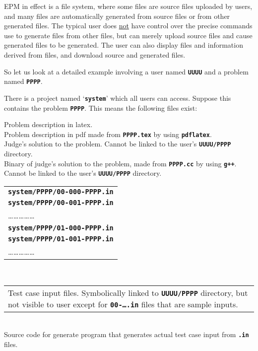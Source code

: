 \documentclass[12pt]{article}
\newcommand{\TT}[1]{{\tt \bfseries #1}}
\newenvironment{indpar}[1][0.4in]%
	{\begin{list}{}%
		     {\setlength{\itemsep}{0in}%
		      \setlength{\topsep}{0in}%
		      \setlength{\parsep}{1ex}%
		      \setlength{\labelwidth}{#1}%
		      \setlength{\leftmargin}{#1}%
		      \addtolength{\leftmargin}{\labelsep}}%
	 \item}%
	{\end{list}}
\newcommand{\ITEM}{\hspace*{-0.2in}}
\begin{document}
EPM in effect is a file system, where some files are source
files uploaded by users, and many files are automatically
generated from source files or from other generated files.
The typical user does \underline{not} have control over
the precise commands use to generate files from other
files, but can merely upload source files and cause generated
files to be generated.  The user can also display files
and information derived from files, and download source
and generated files.

So let us look at a detailed example involving a user named
\TT{UUUU} and a problem named \TT{PPPP}.

There is a project named `\TT{system}' which all users can access.
Suppose this contains the problem \TT{PPPP}.  This means the
following files exist:

\begin{indpar}
\ITEM\TT{system/PPPP/PPPP.tex}  Problem description in latex.
\\
\ITEM\TT{system/PPPP/PPPP.pdf}  Problem description in pdf made from
    \TT{PPPP.tex} by using \TT{pdflatex}.
\\
\ITEM\TT{system/PPPP/PPPP.cc}  Judge's solution to the problem.
    Cannot be linked to the user's \TT{UUUU/PPPP} directory.
\\
\ITEM\TT{system/PPPP/PPPP}  Binary of judge's solution to the problem,
    made from \TT{PPPP.cc} by using \TT{g++}.
    Cannot be linked to the user's \TT{UUUU/PPPP} directory.
\\[1ex]
\ITEM\begin{tabular}[t]{@{}l}
     \TT{system/PPPP/00-000-PPPP.in} \\
     \TT{system/PPPP/00-001-PPPP.in} \\
     \ldots\ldots\ldots\ldots\ldots \\
     \TT{system/PPPP/01-000-PPPP.in} \\
     \TT{system/PPPP/01-001-PPPP.in} \\
     \ldots\ldots\ldots\ldots\ldots \\
     \end{tabular}
     ~~~~
     \begin{tabular}[t]{p{3in}}
     Test case input files.  Symbolically linked to \TT{UUUU/PPPP}
     directory, but not visible to user except for \TT{00-\ldots.in}
     files that are sample inputs.
     \end{tabular}
\\
\ITEM\TT{system/PPPP/generate\_PPPP.cc}  Source code for generate
    program that generates actual test case input from \TT{.in} files.

\end{indpar}
\end{document}
